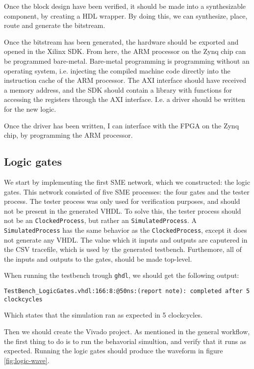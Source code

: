Once the block design have been verified, it should be made into a
synthesizable component, by creating a HDL wrapper. By doing this,
we can synthesize, place, route and generate the bitstream.

Once the bitstream has been generated, the hardware should be exported and
opened in the Xilinx SDK. From here, the ARM processor on the Zynq chip can be
programmed bare-metal. Bare-metal programming is programming without an operating
system, i.e. injecting the compiled machine code directly into the instruction
cache of the ARM processor. The AXI interface should have received a memory address,
and the SDK should contain a library with functions for accessing the registers
through the AXI interface. I.e. a driver should be written for the new logic.

Once the driver has been written, I can interface with the FPGA on the Zynq
chip, by programming the ARM processor.

\subsection{Logic gates}
We start by implementing the first SME network, which we constructed: the logic
gates. This network consisted of five SME processes: the four gates and the
tester process. The tester process was only used for verification purposes, and
should not be present in the generated VHDL. To solve this, the tester process
should not be an \texttt{ClockedProcess}, but rather an
\texttt{SimulatedProcess}. A \texttt{SimulatedProcess} has the same behavior as
the \texttt{ClockedProcess}, except it does not generate any VHDL. The value
which it inputs and outputs are caputered in the CSV tracefile, which is used
by the generated testbench. Furthemore, all of the inputs and outputs to the
gates, should be made top-level.

When running the testbench trough \texttt{ghdl}, we should get the following
output:
\begin{lstlisting}
TestBench_LogicGates.vhdl:166:8:@50ns:(report note): completed after 5 clockcycles
\end{lstlisting}
Which states that the simulation ran as expected in 5 clockcycles.

Then we should create the Vivado project. As mentioned in the general workflow,
the first thing to do is to run the behavorial simultion, and verify that it
runs as expected. Running the logic gates should produce the waveform in figure
\ref{fig:logic-wave}.

